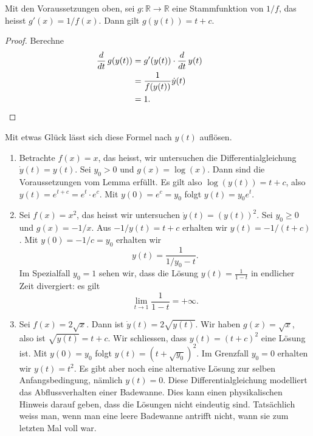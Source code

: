 \documentclass[../main.tex]{subfiles}
\begin{document}
\begin{lemma*}
  Mit den Voraussetzungen oben,
  sei $g \colon \mathbb{R} \to \mathbb{R}$ eine Stammfunktion
  von $1/f$, das heisst $g'(x) = 1/f(x)$.
  Dann gilt $g(y(t)) = t + c$.
\end{lemma*}

\begin{proof}
  Berechne
  \begin{align*}
    \frac{d}{dt} \, g(y(t))
    &= g'(y(t)) \cdot \frac{d}{dt} \, y(t)\\
    &= \frac{1}{f(y(t))} \dot y(t) \\
    &= 1. && \qedhere
  \end{align*}
\end{proof}

Mit etwas Glück lässt sich diese Formel nach $y(t)$ auflösen.

\begin{examples}
  \leavevmode
  \begin{enumerate}[(1)]
    \item Betrachte $f(x) = x$, das heisst, wir untersuchen
      die Differentialgleichung $\dot y(t) = y(t)$.
      Sei $y_0 > 0$ und $g(x) = \log(x)$.
      Dann sind die Voraussetzungen vom Lemma erfüllt.
      Es gilt also $\log(y(t)) = t + c$, also
      $y(t) = e^{t + c} = e^t \cdot e^c$.
      Mit $y(0) = e^c = y_0$ folgt $y(t) = y_0 e^t$.
    \item Sei $f(x) = x^2$, das heisst
      wir untersuchen $\dot y(t) = {(y(t))}^2$.
      Sei $y_0 \geq 0$ und
      $g(x) = -1/x$.
      Aus $-1/y(t) = t + c$ erhalten wir
      $y(t) = -1/(t + c)$.
      Mit  $y(0) = -1/c = y_0$ erhalten wir
      \[
        y(t) = \frac{1}{1/y_0 - t}.
      \]
      Im Spezialfall $y_0 = 1$ sehen wir,
      dass die Lösung $y(t) = \frac{1}{1-t}$ 
      in endlicher Zeit divergiert: es gilt
      \[
        \lim_{t \to 1} \frac{1}{1-t} = +\infty.
      \]
    \item Sei $f(x) = 2\sqrt x$. Dann ist
      $\dot y (t) = 2 \sqrt{y(t)}$.
      Wir haben $g(x) = \sqrt x$,
      also ist $\sqrt{y(t)} = t + c$.
      Wir schliessen, dass
      $y(t) = {(t + c)}^2$ eine Lösung
      ist.
      Mit $y(0) = y_0$ folgt
      $y(t) = {(t + \sqrt {y_0})}^2$.
      Im Grenzfall  $y_0 = 0$ 
      erhalten wir $y(t) = t^2$.
      Es gibt aber noch eine alternative
      Lösung zur selben Anfangsbedingung,
      nämlich $y(t) = 0$.
      Diese Differentialgleichung modelliert das
      Abflussverhalten einer Badewanne.
      Dies kann einen physikalischen Hinweis darauf geben, dass
      die Lösungen nicht eindeutig sind. Tatsächlich
      weiss man, wenn man eine leere Badewanne antrifft
      nicht, wann sie zum letzten Mal voll war.
  \end{enumerate}
\end{examples}
\end{document}
